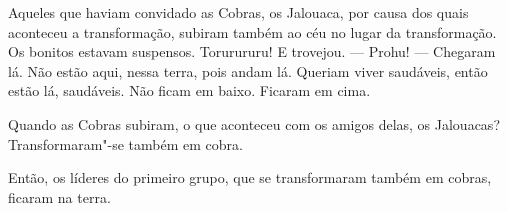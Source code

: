 Aqueles que haviam convidado as Cobras, os Jalouaca, por causa dos quais
aconteceu a transformação, subiram também ao céu no lugar da
transformação. Os bonitos estavam suspensos. Torurururu! E
trovejou. --- Prohu! --- Chegaram lá. Não estão aqui, nessa terra,
pois andam lá. Queriam viver saudáveis, então estão lá, saudáveis. Não
ficam em baixo. Ficaram em cima. 

Quando as Cobras subiram, o que aconteceu com os amigos delas, os
Jalouacas? Transformaram"-se também em cobra. 

Então, os líderes do primeiro grupo, que se transformaram também
em cobras, ficaram na terra.